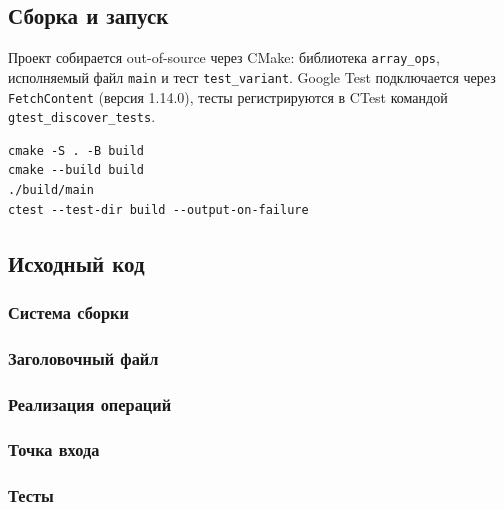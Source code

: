 \subsection{Сборка и запуск}

Проект собирается out-of-source через CMake: библиотека \texttt{array\_ops},
исполняемый файл \texttt{main} и тест \texttt{test\_variant}. Google Test
подключается через \texttt{FetchContent} (версия 1.14.0), тесты регистрируются
в CTest командой \texttt{gtest\_discover\_tests}.

\begin{lstlisting}[style=cmakestyle,caption={Сборка и запуск},numbers=none]
cmake -S . -B build
cmake --build build
./build/main
ctest --test-dir build --output-on-failure
\end{lstlisting}

\subsection{Исходный код}

\subsubsection{Система сборки}



\subsubsection{Заголовочный файл}



\subsubsection{Реализация операций}



\subsubsection{Точка входа}



\subsubsection{Тесты}


